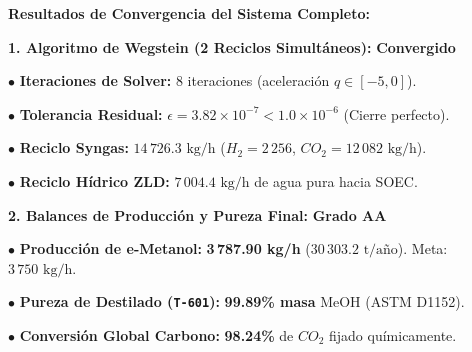 \documentclass[10pt,landscape]{article}
\newcommand{\badgegreen}[1]{\colorbox{badgegreen}{\textbf{\color{emeraldgreen}\fontsize{6.8pt}{8pt}\selectfont #1}}}
\begin{document}
\begin{minipage}[t]{0.47\textwidth}
  \begin{tcolorbox}[colback=white,colframe=navyblue!70,arc=1.5mm,boxrule=0.7pt,top=2pt,bottom=2pt,left=3pt,right=3pt,height=4.8cm]
    {\fontsize{6.5pt}{7.5pt}\selectfont \textbf{\color{navyblue}Resultados de Convergencia del Sistema Completo:}}\par
    \vspace{1.5pt}
    
    \begin{tcolorbox}[colback=softblue,colframe=navyblue!40,arc=1.0mm,boxrule=0.5pt,top=1.2pt,bottom=1.2pt,left=2.5pt,right=2.5pt]
      {\fontsize{5.2pt}{6.2pt}\selectfont \textbf{\color{navyblue}1. Algoritmo de Wegstein (2 Reciclos Simultáneos):} \hfill \badgegreen{Convergido}}\par
      {\fontsize{4.7pt}{5.6pt}\selectfont
        $\bullet$ \textbf{Iteraciones de Solver:} 8 iteraciones (aceleración $q \in [-5, 0]$).\par
        $\bullet$ \textbf{Tolerancia Residual:} $\epsilon = 3.82 \times 10^{-7} < 1.0 \times 10^{-6}$ (Cierre perfecto).\par
        $\bullet$ \textbf{Reciclo Syngas:} $14\,726.3\text{ kg/h}$ ($H_2=2\,256$, $CO_2=12\,082\text{ kg/h}$).\par
        $\bullet$ \textbf{Reciclo Hídrico ZLD:} $7\,004.4\text{ kg/h}$ de agua pura hacia SOEC.
      }
    \end{tcolorbox}
    \vspace{1.0pt}
    \begin{tcolorbox}[colback=softblue,colframe=navyblue!40,arc=1.0mm,boxrule=0.5pt,top=1.2pt,bottom=1.2pt,left=2.5pt,right=2.5pt]
      {\fontsize{5.2pt}{6.2pt}\selectfont \textbf{\color{navyblue}2. Balances de Producción y Pureza Final:} \hfill \badgegreen{Grado AA}}\par
      {\fontsize{4.7pt}{5.6pt}\selectfont
        $\bullet$ \textbf{Producción de e-Metanol:} \textbf{3\,787.90 kg/h} ($30\,303.2\text{ t/año}$). Meta: $3\,750\text{ kg/h}$.\par
        $\bullet$ \textbf{Pureza de Destilado (\texttt{T-601}):} \textbf{99.89\% masa} MeOH (ASTM D1152).\par
        $\bullet$ \textbf{Conversión Global Carbono:} \textbf{98.24\%} de $CO_2$ fijado químicamente.
      }
    \end{tcolorbox}
  \end{tcolorbox}
\end{minipage}
\end{document}
